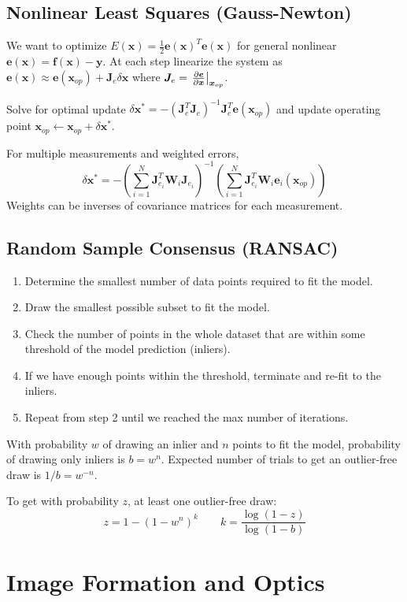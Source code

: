 \documentclass[twocolumn, 10pt]{extarticle}
\begin{document}
\subsection{Nonlinear Least Squares (Gauss-Newton)}

We want to optimize \(E(\bm x) = \frac{1}{2}\bm e(\bm x)^T\bm e(\bm x)\) for general nonlinear \(\bm e(\bm x) = \bm f(\bm x) - \bm y\).
At each step linearize the system as \(\bm e(\bm x) \approx \bm e(\bm x_{op}) + \bm J_e\delta\bm x\) where
\(\bm J_e = \left.\frac{\partial\bm e}{\partial\bm x}\right\rvert_{\bm x_{op}}\).

Solve for optimal update \(\delta\bm x^* = -(\bm J_e^T\bm J_e)^{-1}\bm J_e^T\bm e(\bm x_{op})\) and update operating point
\(\bm x_{op} \gets \bm x_{op} + \delta\bm x^*\).

For multiple measurements and weighted errors,
\[
\delta\bm x^* = -\left(\sum _{i = 1}^N \bm J_{e_i}^T\bm W_i\bm J_{e_i}\right)^{-1}\left(\sum _{i = 1}^N \bm J_{e_i}^T\bm W_i\bm e_i(\bm x_{op})\right)
\]
Weights can be inverses of covariance matrices for each measurement.

\subsection{Random Sample Consensus (RANSAC)}

\begin{enumerate}
    \item Determine the smallest number of data points required to fit the model.
    \item Draw the smallest possible subset to fit the model.
    \item Check the number of points in the whole dataset that are within some threshold of the model prediction (inliers).
    \item If we have enough points within the threshold, terminate and re-fit to the inliers.
    \item Repeat from step 2 until we reached the max number of iterations.
\end{enumerate}

With probability \(w\) of drawing an inlier and \(n\) points to fit the model, probability of drawing only inliers is
\(b = w^n\). Expected number of trials to get an outlier-free draw is \(1/b = w^{-n}\).

To get with probability \(z\), at least one outlier-free draw:
\[z = 1 - (1 - w^n)^k \qquad k = \frac{\log(1 - z)}{\log(1 - b)}\]

\section{Image Formation and Optics} %
\end{document}
